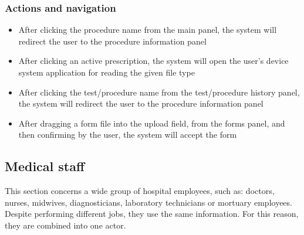 \subsubsection{Actions and navigation}
\begin{itemize}
    \item After clicking the procedure name from the main panel, the system will redirect the user to the procedure information panel
    \item After clicking an active prescription, the system will open the user's device system application for reading the given file type
    \item After clicking the test/procedure name from the test/procedure history panel, the system will redirect the user to the procedure information panel
    \item After dragging a form file into the upload field, from the forms panel, and then confirming by the user, the system will accept the form
\end{itemize}
\subsection{Medical staff}
This section concerns a wide group of hospital employees, such as: doctors, nurses, midwives, diagnosticians, laboratory technicians or mortuary employees. Despite performing different jobs, they use the same information. For this reason, they are combined into one actor.
